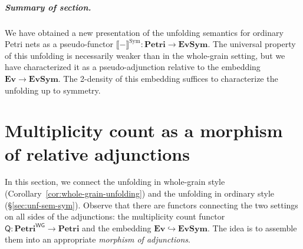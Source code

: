 \documentclass[11pt,a4paper]{article}
\theoremstyle{plain}
\theoremstyle{definition}
\theoremstyle{remark}
\newcommand{\Petri}{\mathbf{Petri}}
\newcommand{\WGPetri}{\mathbf{Petri}^{\mathsf{WG}}}
\newcommand{\ES}{\mathbf{Ev}}
\newcommand{\SES}{\mathbf{EvSym}}
\newcommand{\Q}{\mathsf{Q}}
\newcommand{\semSA}[1]{\llbracket #1 \rrbracket^{\mathrm{Sym}}}
\begin{document}
\subparagraph*{Summary of section.} We have obtained a new presentation of the unfolding semantics for ordinary Petri nets as a pseudo-functor $\semSA{-} : \Petri \to \SES$. The universal property of this unfolding is necessarily weaker than in the whole-grain setting, but we have characterized it as a pseudo-adjunction relative to the embedding $\ES \to \SES$. The 2-density of this embedding suffices to characterize the unfolding up to symmetry. 



\section{Multiplicity count as a morphism of relative adjunctions}
\label{sec:adjunction-morphism}

In this section, we connect the unfolding in whole-grain style (Corollary~\ref{cor:whole-grain-unfolding}) and the unfolding in ordinary style (\S\ref{sec:unf-sem-sym}). Observe that there are functors connecting the two settings on all sides of the adjunctions: the multiplicity count functor $\Q : \WGPetri \to \Petri$ and the embedding $\ES \hookrightarrow \SES$. 
The idea is to assemble them into an appropriate \emph{morphism of adjunctions}.
\end{document}
